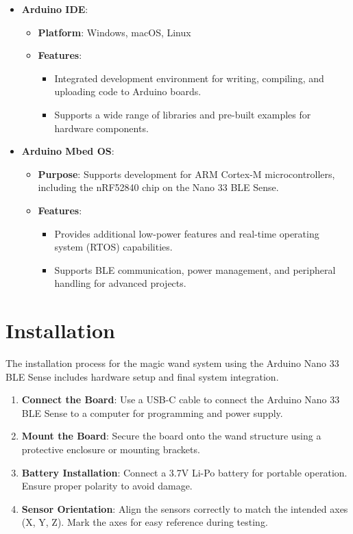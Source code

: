 	\begin{itemize}
		\item \textbf{Arduino IDE}:
		\begin{itemize}
			\item \textbf{Platform}: Windows, macOS, Linux
			\item \textbf{Features}:
			\begin{itemize}
				\item Integrated development environment for writing, compiling, and uploading code to Arduino boards.
				\item Supports a wide range of libraries and pre-built examples for hardware components.
			\end{itemize}
		\end{itemize}
		
		\item \textbf{Arduino Mbed OS}:
		\begin{itemize}
			\item \textbf{Purpose}: Supports development for ARM Cortex-M microcontrollers, including the nRF52840 chip on the Nano 33 BLE Sense.
			\item \textbf{Features}:
			\begin{itemize}
				\item Provides additional low-power features and real-time operating system (RTOS) capabilities.
				\item Supports BLE communication, power management, and peripheral handling for advanced projects.
			\end{itemize}
		\end{itemize}
	\end{itemize}

\section{Installation}
	The installation process for the magic wand system using the Arduino Nano 33 BLE Sense includes hardware setup and final system integration.
	
	\begin{enumerate}
		\item \textbf{Connect the Board}: Use a USB-C cable to connect the Arduino Nano 33 BLE Sense to a computer for programming and power supply.
		\item \textbf{Mount the Board}: Secure the board onto the wand structure using a protective enclosure or mounting brackets.
		\item \textbf{Battery Installation}: Connect a 3.7V Li-Po battery for portable operation. Ensure proper polarity to avoid damage.
		\item \textbf{Sensor Orientation}: Align the sensors correctly to match the intended axes (X, Y, Z). Mark the axes for easy reference during testing.
	\end{enumerate}

